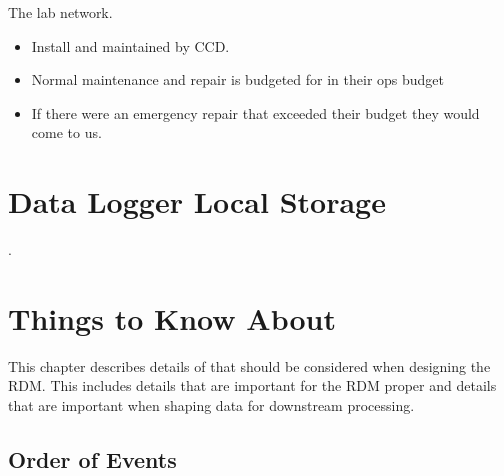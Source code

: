 The lab network.
\begin{itemize}
\item Install and maintained by CCD.
\item Normal maintenance and repair is budgeted for in their ops budget
\item If there were an emergency repair that exceeded their budget they would come to us. 
\end{itemize}

\chapter{Data Logger Local Storage}
\label{app:DataLoggerLocalStorage}

.

\chapter{Things to Know About \art}

This chapter describes details of \art that should be considered when
designing the RDM.  This includes details that are important for the RDM
proper and details that are important when shaping data for downstream
processing.

\section{Order of Events}


\clearpage
{}
{}
\printbibliography


